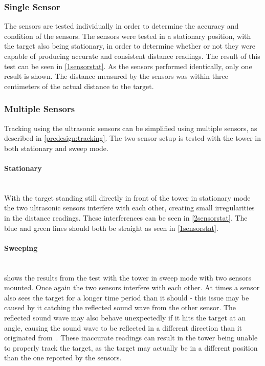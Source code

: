 \vspace{0.01pt}

\subsubsection{Single Sensor}\label{singlesensorult}
The sensors are tested individually in order to determine the accuracy and condition of the sensors. The sensors were tested in a stationary position, with the target also being stationary, in order to determine whether or not they were capable of producing accurate and consistent distance readings. The result of this test can be seen in \cref{1sensorstat}. As the sensors performed identically, only one result is shown. The distance measured by the sensors was within three centimeters of the actual distance to the target. \\




\subsubsection{Multiple Sensors}
\label{MultiSensor}
Tracking using the ultrasonic sensors can be simplified using multiple sensors, as described in \cref{predesign:tracking}. The two-sensor setup is tested with the tower in both stationary and sweep mode.

\paragraph{Stationary} ~\\
With the target standing still directly in front of the tower in stationary mode the two ultrasonic sensors interfere with each other, creating small irregularities in the distance readings. These interferences can be seen in \cref{2sensorstat}. The blue and green lines should both be straight as seen in \cref{1sensorstat}. \\


\vspace{0.5pt}

\paragraph{Sweeping} ~\\
 shows the results from the test with the tower in sweep mode with two sensors mounted. Once again the two sensors interfere with each other. At times a sensor also sees the target for a longer time period than it should - this issue may be caused by it catching the reflected sound wave from the other sensor. The reflected sound wave may also behave unexpectedly if it hits the target at an angle, causing the sound wave to be reflected in a different direction than it originated from~\cite{sound_reflection}. These inaccurate readings can result in the tower being unable to properly track the target, as the target may actually be in a different position than the one reported by the sensors. 

